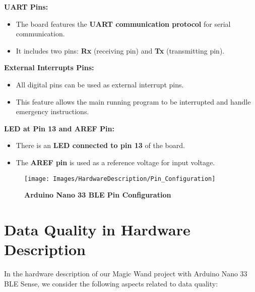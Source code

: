 \textbf{UART Pins:}
\begin{itemize}[noitemsep]
	\item The board features the \textbf{UART communication protocol} for serial communication.
	\item It includes two pins: \textbf{Rx} (receiving pin) and \textbf{Tx} (transmitting pin).
\end{itemize}

\textbf{External Interrupts Pins:}
\begin{itemize}[noitemsep]
	\item All digital pins can be used as external interrupt pins.
	\item This feature allows the main running program to be interrupted and handle emergency instructions.
\end{itemize}

\textbf{LED at Pin 13 and AREF Pin:}
\begin{itemize}[noitemsep]
	\item There is an \textbf{LED connected to pin 13} of the board.
	\item The \textbf{AREF pin} is used as a reference voltage for input voltage.
\end{itemize}

\begin{figure}[h!]
	\texttt{[image: Images/HardwareDescription/Pin\_Configuration]}
	\caption{\textbf{Arduino Nano 33 BLE Pin Configuration}}
	\label{Arduino Nano 33 BLE Pin Configuration} \cite{Arduino:2023}
\end{figure}

\section{Data Quality in Hardware Description}

In the hardware description of our Magic Wand project with Arduino Nano 33 BLE Sense, we consider the following aspects related to data quality:

